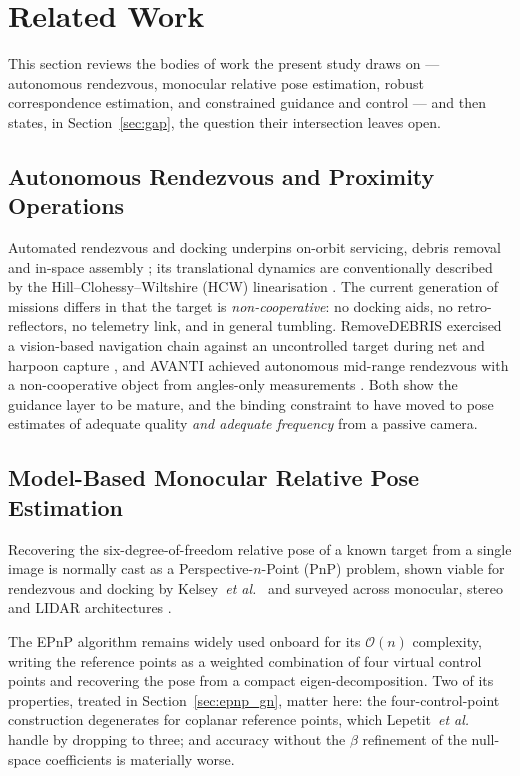 \section{Related Work}
\label{sec:related}

This section reviews the bodies of work the present study draws on ---
autonomous rendezvous, monocular relative pose estimation, robust
correspondence estimation, and constrained guidance and control --- and then
states, in Section~\ref{sec:gap}, the question their intersection leaves open.

\subsection{Autonomous Rendezvous and Proximity Operations}
\label{sec:rw_arpo}

Automated rendezvous and docking underpins on-orbit servicing, debris removal
and in-space assembly \cite{fehse2003rendezvous,flores2014}; its translational
dynamics are conventionally described by the Hill--Clohessy--Wiltshire (HCW)
linearisation \cite{clohessy1960}. The current generation of missions differs
in that the target is \emph{non-cooperative}: no docking aids, no
retro-reflectors, no telemetry link, and in general tumbling. RemoveDEBRIS
exercised a vision-based navigation chain against an uncontrolled target
during net and harpoon capture \cite{aglietti2020removedebris}, and AVANTI
achieved autonomous mid-range rendezvous with a non-cooperative object from
angles-only measurements \cite{gaias2018avanti}. Both show the guidance layer
to be mature, and the binding constraint to have moved to pose estimates of
adequate quality \emph{and adequate frequency} from a passive camera.

\subsection{Model-Based Monocular Relative Pose Estimation}
\label{sec:rw_pose}

Recovering the six-degree-of-freedom relative pose of a known target from a
single image is normally cast as a Perspective-$n$-Point (PnP) problem, shown
viable for rendezvous and docking by Kelsey~\textit{et al.}~\cite{kelsey2006}
and surveyed across monocular, stereo and LIDAR architectures
\cite{opromolla2017review,cassinis2019review}.

The EPnP algorithm \cite{lepetit2009epnp} remains widely used onboard for its
$\mathcal{O}(n)$ complexity, writing the reference points as a weighted
combination of four virtual control points and recovering the pose from a
compact eigen-decomposition. Two of its properties, treated in
Section~\ref{sec:epnp_gn}, matter here: the four-control-point construction
degenerates for coplanar reference points, which Lepetit~\textit{et al.}
handle by dropping to three; and accuracy without the $\beta$ refinement of
the null-space coefficients is materially worse.

